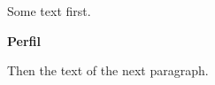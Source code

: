 \documentclass{article}
\begin{document}
Some text first.

{\large\bfseries\color{teal}Perfil}\par
Then the text of the next paragraph.
\end{document}
